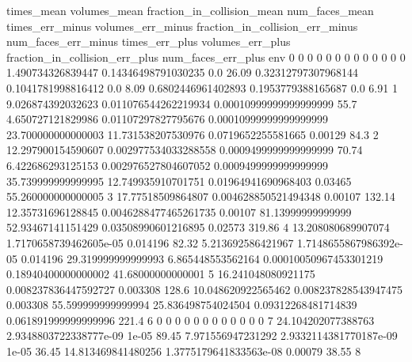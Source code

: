 times_mean	volumes_mean	fraction_in_collision_mean	num_faces_mean	times_err_minus	volumes_err_minus	fraction_in_collision_err_minus	num_faces_err_minus	times_err_plus	volumes_err_plus	fraction_in_collision_err_plus	num_faces_err_plus	env
0	0	0	0	0	0	0	0	0	0	0	0	0
1.490734326839447	0.14346498791030235	0.0	26.09	0.32312797307968144	0.1041781998816412	0.0	8.09	0.6802446961402893	0.1953779388165687	0.0	6.91	1
9.026874392032623	0.011076544262219934	0.00010999999999999999	55.7	4.650727121829986	0.01107297827795676	0.00010999999999999999	23.700000000000003	11.731538207530976	0.0719652255581665	0.00129	84.3	2
12.297900154590607	0.002977534033288558	0.0009499999999999999	70.74	6.422686293125153	0.002976527804607052	0.0009499999999999999	35.739999999999995	12.749935910701751	0.01964941690968403	0.03465	55.260000000000005	3
17.77518509864807	0.004628850521494348	0.00107	132.14	12.35731696128845	0.0046288477465261735	0.00107	81.13999999999999	52.93467141151429	0.03508990601216895	0.02573	319.86	4
13.208080689907074	1.7170658739462605e-05	0.014196	82.32	5.213692586421967	1.7148655867986392e-05	0.014196	29.319999999999993	6.865448553562164	0.00010050967453301219	0.18940400000000002	41.68000000000001	5
16.241048080921175	0.008237836447592727	0.003308	128.6	10.048620922565462	0.008237828543947475	0.003308	55.599999999999994	25.836498754024504	0.09312268481714839	0.061891999999999996	221.4	6
0	0	0	0	0	0	0	0	0	0	0	0	7
24.104202077388763	2.9348803722338777e-09	1e-05	89.45	7.971556947231292	2.9332114381770187e-09	1e-05	36.45	14.813469841480256	1.3775179641833563e-08	0.00079	38.55	8
